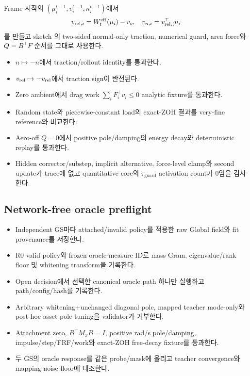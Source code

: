 \documentclass[10pt]{article}
\begin{document}
Frame 시작의 \((\mu_i^{t-1},v_i^{t-1},n_i^{t-1})\)에서
\[
  v_{{\rm rel},i}=W_t^{\rm eff}(\mu_i)-v_i,\quad
  v_{n,i}=v_{{\rm rel},i}^\top n_i
\]
를 만들고 sketch 의 two-sided normal-only traction, numerical guard, area force와
\(Q=B^\top F\) 순서를 그대로 사용한다.

\begin{itemize}
  \item[$\square$] \(n\mapsto-n\)에서 traction/rollout identity를 통과한다.
  \item[$\square$] \(v_{\rm rel}\mapsto-v_{\rm rel}\)에서 traction sign이 반전된다.
  \item[$\square$] Zero ambient에서 drag work \(\sum_iF_i^\top v_i\le0\) analytic fixture를 통과한다.
  \item[$\square$] Random state와 piecewise-constant load의 exact-ZOH 결과를 very-fine reference와 비교한다.
  \item[$\square$] Aero-off \(Q=0\)에서 positive pole/damping의 energy decay와 deterministic replay를 통과한다.
  \item[$\square$] Hidden corrector/substep, implicit alternative, force-level clamp와 second update가 trace에 없고
  quantitative core의 \(\tau_{\mathrm{guard}}\) activation count가 0임을 검사한다.
\end{itemize}

\subsection{Network-free oracle preflight}

\begin{itemize}
  \item[$\square$] Independent GS마다 attached/invalid policy를 적용한 raw Global field와 fit provenance를 저장한다.
  \item[$\square$] R0 valid policy와 frozen oracle-measure ID로 mass Gram, eigenvalue/rank floor 및 whitening transform을 기록한다.
  \item[$\square$] Open decision에서 선택한 canonical oracle path 하나만 실행하고 path/config/hash를 기록한다.
  \item[$\square$] Arbitrary whitening+unchanged diagonal pole, mapped teacher mode-only와 post-hoc asset pole tuning을 validator가 거부한다.
  \item[$\square$] Attachment zero, \(B^\top M_xB=I\), positive rad/s pole/damping, impulse/step/FRF/work와
  exact-ZOH free-decay fixture를 통과한다.
  \item[$\square$] 두 GS의 oracle response를 같은 probe/mask에 올리고 teacher convergence와 mapping-noise floor에 대조한다.
\end{itemize}
\end{document}
